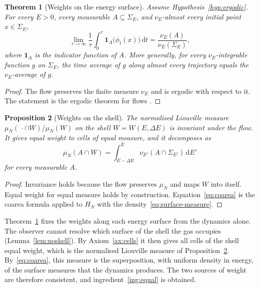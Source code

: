 \documentclass[11pt,a4paper]{article}
\newtheorem{theorem}{Theorem}[section]
\newtheorem{proposition}[theorem]{Proposition}
\theoremstyle{definition}
\theoremstyle{remark}
\newcommand{\dd}{\mathrm{d}}
\begin{document}
\begin{theorem}[Weights on the energy surface]
\label{thm:weights}
Assume Hypothesis~\ref{hyp:ergodic}.
For every $E>0$, every measurable $A\subseteq\Sigma_E$, and $\nu_E$-almost every initial point $x\in\Sigma_E$,
\begin{equation}
\lim_{\tau\to\infty}\frac1\tau\int_0^{\tau}\mathbf 1_A\bigl(\phi_t(x)\bigr)\,\dd t=\frac{\nu_E(A)}{\nu_E(\Sigma_E)},
\label{eq:birkhoff}
\end{equation}
where $\mathbf 1_A$ is the indicator function of $A$.
More generally, for every $\nu_E$-integrable function $g$ on $\Sigma_E$, the time average of $g$ along almost every trajectory equals the $\nu_E$-average of $g$.
\end{theorem}

\begin{proof}
The flow preserves the finite measure $\nu_E$ and is ergodic with respect to it.
The statement is the ergodic theorem for flows \citep{birkhoff1931,walters1982}.
\end{proof}

\begin{proposition}[Weights on the shell]
\label{prop:shell-weights}
The normalised Liouville measure $\mu_N(\,\cdot\cap W)/\mu_N(W)$ on the shell $W=W(E,\Delta E)$ is invariant under the flow.
It gives equal weight to cells of equal measure, and it decomposes as
\begin{equation}
\mu_N(A\cap W)=\int_{E-\Delta E}^{E}\nu_{E'}(A\cap\Sigma_{E'})\,\dd E'
\label{eq:coarea}
\end{equation}
for every measurable $A$.
\end{proposition}

\begin{proof}
Invariance holds because the flow preserves $\mu_N$ and maps $W$ into itself.
Equal weight for equal measure holds by construction.
Equation~\eqref{eq:coarea} is the coarea formula applied to $H_N$ with the density~\eqref{eq:surface-measure}.
\end{proof}

Theorem~\ref{thm:weights} fixes the weights along each energy surface from the dynamics alone.
The observer cannot resolve which surface of the shell the gas occupies (Lemma~\ref{lem:noshell}).
By Axiom~\ref{ax:cells} it then gives all cells of the shell equal weight, which is the normalised Liouville measure of Proposition~\ref{prop:shell-weights}.
By~\eqref{eq:coarea}, this measure is the superposition, with uniform density in energy, of the surface measures that the dynamics produces.
The two sources of weight are therefore consistent, and ingredient~\ref{ing:equal} is obtained.
\end{document}
